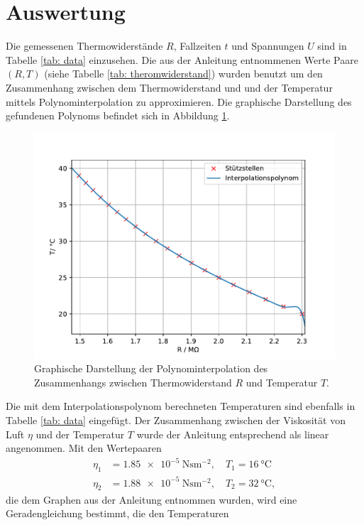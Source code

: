 \section{Auswertung}
Die gemessenen Thermowiderstände $R$, Fallzeiten $t$ und Spannungen $U$ sind in Tabelle \ref{tab: data} einzusehen.
Die aus der Anleitung entnommenen Werte Paare $(R, T)$ (siehe Tabelle \ref{tab: theromwiderstand}) wurden benutzt um den Zusammenhang
zwischen dem Thermowiderstand und und der Temperatur mittels Polynominterpolation zu approximieren. Die graphische
Darstellung des gefundenen Polynoms befindet sich in Abbildung \ref{fig: poly}.

\begin{figure}
  \centering
  \includegraphics[width = \textwidth]{../Messdaten/temperature_fit.pdf}
  \caption{Graphische Darstellung der Polynominterpolation des Zusammenhangs zwischen Thermowiderstand $R$ und Temperatur $T$.}
  \label{fig: poly}
\end{figure}
 Die mit dem Interpolationspolynom berechneten
Temperaturen sind ebenfalls in Tabelle \ref{tab: data} eingefügt. Der Zusammenhang zwischen der Viskosität von Luft $\eta$ und
der Temperatur $T$ wurde der Anleitung \cite{anleitung503} entsprechend als linear angenommen. Mit den Wertepaaren
\begin{align}
  \eta_1 &= \SI{1.85e-5}{\newton\second\meter^{-2}}, \quad T_1 = \SI{16}{\celsius} \\
  \eta_2 &= \SI{1.88e-5}{\newton\second\meter^{-2}}, \quad T_2 = \SI{32}{\celsius},
\end{align}
die dem Graphen aus der Anleitung entnommen wurden, wird eine Geradengleichung bestimmt, die den Temperaturen
